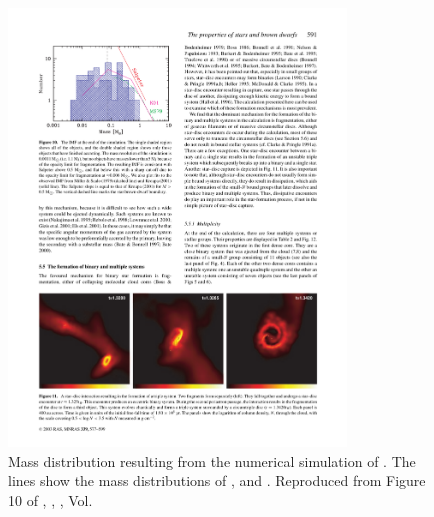 \begin{figure}[ht!]
\begin{center}
\includegraphics[width=0.8\textwidth]{background/Figures/F10_Bate2003.pdf}
\caption{Mass distribution resulting from the numerical simulation of \citet{2003MNRAS.339..577B}. The lines show the mass distributions of \citet{Salpeter1955}, \citet{1979ApJS...41..513M} and \citet{2001MNRAS.322..231K}. Reproduced from Figure 10 of \citet{2003MNRAS.339..577B}, \textit{}, , Vol. }
\label{fig:IMFBate2003}
\end{center}
\end{figure}

